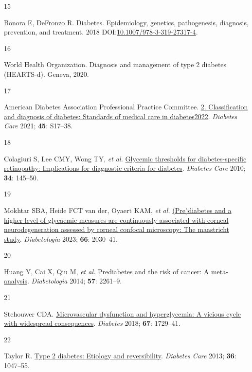 \documentclass[
  letterpaper,
  headsepline=true,
  open=any]{scrbook}
\newlength{\cslhangindent}
\newlength{\csllabelwidth}
\newlength{\cslentryspacingunit} %
\newenvironment{CSLReferences}[2] %
 {%
  \setlength{\parindent}{0pt}
  \ifodd #1
  \let\oldpar\par
  \def\par{\hangindent=\cslhangindent\oldpar}
  \fi
  \setlength{\parskip}{#2\cslentryspacingunit}
 }%
 {}
\newcommand{\CSLLeftMargin}[1]{\parbox[t]{\csllabelwidth}{#1}}
\newcommand{\CSLRightInline}[1]{\parbox[t]{\linewidth - \csllabelwidth}{#1}\break}
\begin{document}
\begin{CSLReferences}{0}{0}
\leavevmode{}%
\CSLLeftMargin{15 }%
\CSLRightInline{Bonora E, DeFronzo R. Diabetes. Epidemiology, genetics,
pathogenesis, diagnosis, prevention, and treatment. 2018
DOI:\href{https://doi.org/10.1007/978-3-319-27317-4}{10.1007/978-3-319-27317-4}.}

\leavevmode{}%
\CSLLeftMargin{16 }%
\CSLRightInline{World Health Organization. Diagnosis and management of
type 2 diabetes (HEARTS-d). Geneva, 2020.}

\leavevmode{}%
\CSLLeftMargin{17 }%
\CSLRightInline{American Diabetes Association Professional Practice
Committee. \href{https://doi.org/10.2337/dc22-S002}{2. Classification
and diagnosis of diabetes: Standards of medical care in
diabetes{\textemdash}2022}. \emph{Diabetes Care} 2021; \textbf{45}:
S17--38.}

\leavevmode{}%
\CSLLeftMargin{18 }%
\CSLRightInline{Colagiuri S, Lee CMY, Wong TY, \emph{et al.}
\href{https://doi.org/10.2337/dc10-1206}{Glycemic thresholds for
diabetes-specific retinopathy: Implications for diagnostic criteria for
diabetes}. \emph{Diabetes Care} 2010; \textbf{34}: 145--50.}

\leavevmode{}%
\CSLLeftMargin{19 }%
\CSLRightInline{Mokhtar SBA, Heide FCT van der, Oyaert KAM, \emph{et
al.} \href{https://doi.org/10.1007/s00125-023-05986-5}{(Pre)diabetes and
a higher level of glycaemic measures are continuously associated with
corneal neurodegeneration assessed by corneal confocal microscopy: The
maastricht study}. \emph{Diabetologia} 2023; \textbf{66}: 2030--41.}

\leavevmode{}%
\CSLLeftMargin{20 }%
\CSLRightInline{Huang Y, Cai X, Qiu M, \emph{et al.}
\href{https://doi.org/10.1007/s00125-014-3361-2}{Prediabetes and the
risk of cancer: A meta-analysis}. \emph{Diabetologia} 2014; \textbf{57}:
2261--9.}

\leavevmode{}%
\CSLLeftMargin{21 }%
\CSLRightInline{Stehouwer CDA.
\href{https://doi.org/10.2337/dbi17-0044}{Microvascular dysfunction and
hyperglycemia: A vicious cycle with widespread consequences}.
\emph{Diabetes} 2018; \textbf{67}: 1729--41.}

\leavevmode{}%
\CSLLeftMargin{22 }%
\CSLRightInline{Taylor R. \href{https://doi.org/10.2337/dc12-1805}{Type
2 diabetes: Etiology and reversibility}. \emph{Diabetes Care} 2013;
\textbf{36}: 1047--55.}


\end{CSLReferences}
\end{document}
